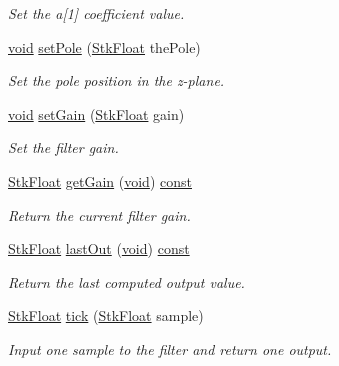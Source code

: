 \begin{DoxyCompactItemize}
\begin{DoxyCompactList}\small\item\em Set the a\mbox{[}1\mbox{]} coefficient value. \end{DoxyCompactList}\item 
\hyperlink{sound_8c_ae35f5844602719cf66324f4de2a658b3}{void} \hyperlink{class_nyq_1_1_one_pole_ac69394c6270e405a7ea09b31dbe25c4d}{set\+Pole} (\hyperlink{namespace_nyq_a044fa20a706520a617bbbf458a7db7e4}{Stk\+Float} the\+Pole)
\begin{DoxyCompactList}\small\item\em Set the pole position in the z-\/plane. \end{DoxyCompactList}\item 
\hyperlink{sound_8c_ae35f5844602719cf66324f4de2a658b3}{void} \hyperlink{class_nyq_1_1_one_pole_ace5e94d51b7badd4876d9cafcd877138}{set\+Gain} (\hyperlink{namespace_nyq_a044fa20a706520a617bbbf458a7db7e4}{Stk\+Float} gain)
\begin{DoxyCompactList}\small\item\em Set the filter gain. \end{DoxyCompactList}\item 
\hyperlink{namespace_nyq_a044fa20a706520a617bbbf458a7db7e4}{Stk\+Float} \hyperlink{class_nyq_1_1_one_pole_a59fd0dda8f8f9ebc965d2e0e9ffed969}{get\+Gain} (\hyperlink{sound_8c_ae35f5844602719cf66324f4de2a658b3}{void}) \hyperlink{getopt1_8c_a2c212835823e3c54a8ab6d95c652660e}{const} 
\begin{DoxyCompactList}\small\item\em Return the current filter gain. \end{DoxyCompactList}\item 
\hyperlink{namespace_nyq_a044fa20a706520a617bbbf458a7db7e4}{Stk\+Float} \hyperlink{class_nyq_1_1_one_pole_ac9885082f837a791ec91b17926f15237}{last\+Out} (\hyperlink{sound_8c_ae35f5844602719cf66324f4de2a658b3}{void}) \hyperlink{getopt1_8c_a2c212835823e3c54a8ab6d95c652660e}{const} 
\begin{DoxyCompactList}\small\item\em Return the last computed output value. \end{DoxyCompactList}\item 
\hyperlink{namespace_nyq_a044fa20a706520a617bbbf458a7db7e4}{Stk\+Float} \hyperlink{class_nyq_1_1_one_pole_a947343db3b6060cdd57f073055360536}{tick} (\hyperlink{namespace_nyq_a044fa20a706520a617bbbf458a7db7e4}{Stk\+Float} sample)
\begin{DoxyCompactList}\small\item\em Input one sample to the filter and return one output. \end{DoxyCompactList}\item 

\end{DoxyCompactItemize}
